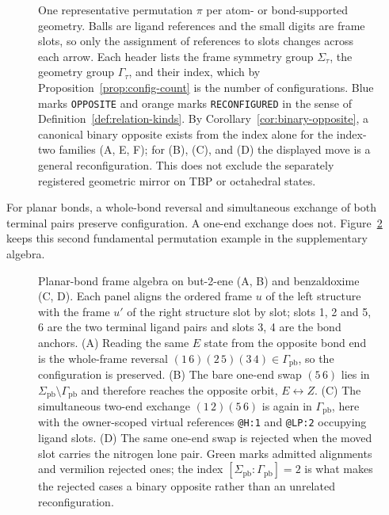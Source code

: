 \documentclass[pdflatex,sn-mathphys-num,referee,lineno]{sn-jnl}
\newcommand{\code}[1]{\texttt{#1}}
\theoremstyle{plain}
\theoremstyle{remark}
\theoremstyle{definition}
\begin{document}
\begin{figure}[htbp]
  \centering
  \resizebox{\textwidth}{!}{}
  \caption{One representative permutation \(\pi\) per atom- or bond-supported
  geometry.  Balls are ligand references and the small digits are frame slots,
  so only the assignment of references to slots changes across each arrow.  Each
  header lists the frame symmetry group \(\Sigma_\tau\), the geometry group
  \(\Gamma_\tau\), and their index, which by
  Proposition~\ref{prop:config-count} is the number of configurations.  Blue
  marks \code{OPPOSITE} and orange marks \code{RECONFIGURED} in the sense of
  Definition~\ref{def:relation-kinds}.  By
  Corollary~\ref{cor:binary-opposite}, a canonical binary opposite exists
  from the index alone for the index-two families (A, E, F); for (B), (C), and
  (D) the displayed move is a general reconfiguration. This does not exclude
  the separately registered geometric mirror on TBP or octahedral states.}
  \label{fig:orbit-examples}
\end{figure}

For planar bonds, a whole-bond reversal and simultaneous exchange of both
terminal pairs preserve configuration.  A one-end exchange does not.
Figure~\ref{fig:planar-alignment} keeps this second fundamental permutation
example in the supplementary algebra.

\begin{figure}[htbp]
  \centering
  \resizebox{0.98\textwidth}{!}{}
  \caption{Planar-bond frame algebra on but-2-ene (A, B) and benzaldoxime
  (C, D).  Each panel aligns the ordered frame \(u\) of the left structure with
  the frame \(u'\) of the right structure slot by slot; slots 1, 2 and 5, 6 are
  the two terminal ligand pairs and slots 3, 4 are the bond anchors.
  (A) Reading the same \(E\) state from the opposite bond end is the whole-frame
  reversal \((1\,6)(2\,5)(3\,4)\in\Gamma_{\mathrm{pb}}\), so the configuration
  is preserved.  (B) The bare one-end swap \((5\,6)\) lies in
  \(\Sigma_{\mathrm{pb}}\setminus\Gamma_{\mathrm{pb}}\) and therefore reaches
  the opposite orbit, \(E\leftrightarrow Z\).  (C) The simultaneous two-end
  exchange \((1\,2)(5\,6)\) is again in \(\Gamma_{\mathrm{pb}}\), here with the
  owner-scoped virtual references \code{@H:1} and \code{@LP:2} occupying ligand
  slots.  (D) The same one-end swap is rejected when the moved slot carries the
  nitrogen lone pair.  Green marks admitted alignments and vermilion rejected
  ones; the index \([\Sigma_{\mathrm{pb}}:\Gamma_{\mathrm{pb}}]=2\) is what
  makes the rejected cases a binary opposite rather than an unrelated
  reconfiguration.}
  \label{fig:planar-alignment}
\end{figure}
\end{document}
